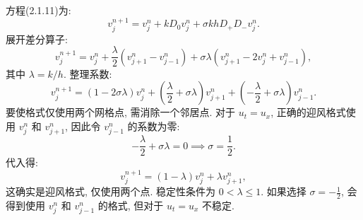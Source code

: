 \documentclass{article}
\begin{document}
        \subsubsection{}
            方程(2.1.11)为:
            \begin{equation*}
                v_j^{n+1} = v_j^n + kD_0v_j^n + \sigma kh D_+ D_- v_j^n.
            \end{equation*}
            展开差分算子:
            \begin{equation*}
                v_j^{n+1} = v_j^n + \frac{\lambda}{2}(v_{j+1}^n - v_{j-1}^n) + \sigma\lambda (v_{j+1}^n - 2v_j^n + v_{j-1}^n),
            \end{equation*}
            其中 $\lambda = k/h$. 整理系数:
            \begin{equation*}
                v_j^{n+1} = (1 - 2\sigma\lambda) v_j^n + \left( \frac{\lambda}{2} + \sigma\lambda \right) v_{j+1}^n + \left( -\frac{\lambda}{2} + \sigma\lambda \right) v_{j-1}^n.
            \end{equation*}
            要使格式仅使用两个网格点, 需消除一个邻居点. 对于 $u_t = u_x$, 正确的迎风格式使用 $v_j^n$ 和 $v_{j+1}^n$, 因此令 $v_{j-1}^n$ 的系数为零:
            \begin{equation*}
                -\frac{\lambda}{2} + \sigma\lambda = 0 \implies \sigma = \frac{1}{2}.
            \end{equation*}
            代入得:
            \begin{equation*}
                v_j^{n+1} = (1 - \lambda) v_j^n + \lambda v_{j+1}^n,
            \end{equation*}
            这确实是迎风格式, 仅使用两个点. 稳定性条件为 $0 < \lambda \leq 1$. 如果选择 $\sigma = -\frac{1}{2}$, 会得到使用 $v_j^n$ 和 $v_{j-1}^n$ 的格式, 但对于 $u_t = u_x$ 不稳定.
\end{document}
